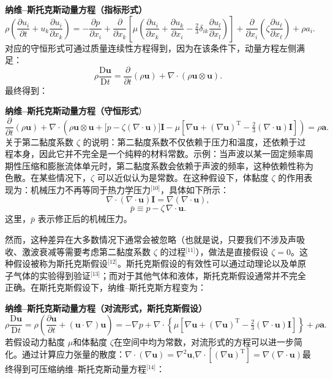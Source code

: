 \textbf{纳维–斯托克斯动量方程（指标形式）}
$$
\rho \left(
\frac{\partial u_{i}}{\partial t}
+ u_{k} \frac{\partial u_{i}}{\partial x_{k}}
\right)
= -\frac{\partial p}{\partial x_{i}}
+ \frac{\partial}{\partial x_{k}}
\left[
\mu \left(
\frac{\partial u_{i}}{\partial x_{k}}
+ \frac{\partial u_{k}}{\partial x_{i}}
- \tfrac{2}{3}\delta_{ik}
\frac{\partial u_{l}}{\partial x_{l}}
\right)
\right]
+ \frac{\partial}{\partial x_{i}}
\left(
\zeta
\frac{\partial u_{\ell}}{\partial x_{\ell}}
\right)
+ \rho a_{i}.~
$$
对应的守恒形式可通过质量连续性方程得到，因为在该条件下，动量方程左侧满足：
$$
\rho \frac{\mathrm{D} \mathbf{u}}{\mathrm{D} t}
= \frac{\partial}{\partial t}(\rho \mathbf{u})
+ \nabla \cdot (\rho \mathbf{u} \otimes \mathbf{u}).~
$$
最终得到：

\textbf{纳维–斯托克斯动量方程（守恒形式}）
$$
\frac{\partial}{\partial t}(\rho \mathbf{u})
+ \nabla \cdot
\left(
\rho \mathbf{u} \otimes \mathbf{u}
+ \big[p - \zeta (\nabla \cdot \mathbf{u})\big]\mathbf{I}
- \mu
\left[
\nabla \mathbf{u}
+ (\nabla \mathbf{u})^{\mathrm{T}}
- \tfrac{2}{3} (\nabla \cdot \mathbf{u}) \mathbf{I}
\right]
\right)
= \rho \mathbf{a}.~
$$
关于第二黏度系数 $\zeta$ 的说明：第二黏度系数不仅依赖于压力和温度，还依赖于过程本身，因此它并不完全是一个纯粹的材料常数。示例：当声波以某一固定频率周期性压缩和膨胀流体单元时，第二黏度系数会依赖于声波的频率，这种依赖性称为色散。在某些情况下，$\zeta$ 可以近似认为是常数。在这种假设下，体黏度 $\zeta$ 的作用表现为：机械压力不再等同于热力学压力\(^\text{[10]}\)，具体如下所示：
$$
\nabla \cdot (\nabla \cdot \mathbf{u})\mathbf{I}
= \nabla (\nabla \cdot \mathbf{u}),~
$$
$$
\bar{p} \equiv p - \zeta \,\nabla \cdot \mathbf{u}.~
$$
这里，$\bar{p}$ 表示修正后的机械压力。

然而，这种差异在大多数情况下通常会被忽略（也就是说，只要我们不涉及声吸收、激波衰减等需要考虑第二黏度系数 $\zeta$ 的过程\(^\text{[11]}\)），做法是直接假设 $\zeta = 0$。这种假设被称为斯托克斯假设\(^\text{[12]}\)。斯托克斯假设的有效性可以通过动理论以及单原子气体的实验得到验证\(^\text{[13]}\)；而对于其他气体和液体，斯托克斯假设通常并不完全正确。在斯托克斯假设下，纳维–斯托克斯方程变为：

\textbf{纳维–斯托克斯动量方程（对流形式，斯托克斯假设）}
$$
\rho \frac{\mathrm{D} \mathbf{u}}{\mathrm{D} t}
= \rho \left(
\frac{\partial \mathbf{u}}{\partial t}
+ (\mathbf{u} \cdot \nabla)\mathbf{u}
\right)
= -\nabla p
+ \nabla \cdot \left\{
\mu \left[
\nabla \mathbf{u}
+ (\nabla \mathbf{u})^{\mathrm{T}}
- \tfrac{2}{3}(\nabla \cdot \mathbf{u}) \mathbf{I}
\right]
\right\}
+ \rho \mathbf{a}.~
$$
若假设动力黏度 $\mu$和体黏度 $\zeta$在空间中均为常数，对流形式的方程可以进一步简化。通过计算应力张量的散度：$\nabla \cdot (\nabla \mathbf{u}) = \nabla^2 \mathbf{u}$,$\nabla \cdot [(\nabla \mathbf{u})^{\mathrm{T}}] = \nabla (\nabla \cdot \mathbf{u})$最终得到可压缩纳维–斯托克斯动量方程\(^\text{[14]}\)：

